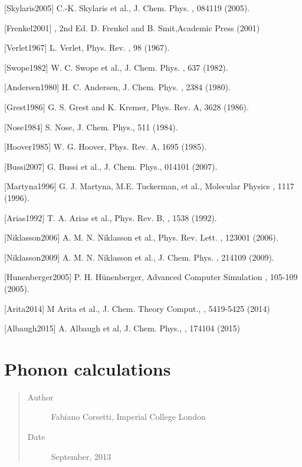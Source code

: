\documentclass[letterpaper,10pt,english]{sphinxmanual}
\begin{document}
{[}Skylaris2005{]} C.-K. Skylaris et al., J. Chem. Phys. , 084119 (2005).

{[}Frenkel2001{]} , 2nd Ed. D. Frenkel and B. Smit,Academic Press (2001)

{[}Verlet1967{]} L. Verlet, Phys. Rev. , 98 (1967).

{[}Swope1982{]} W. C. Swope et al., J. Chem. Phys. , 637 (1982).

{[}Andersen1980{]} H. C. Andersen, J. Chem. Phys. , 2384 (1980).

{[}Grest1986{]} G. S. Grest and K. Kremer, Phys. Rev. A,  3628 (1986).

{[}Nose1984{]} S. Nose, J. Chem. Phys.,  511 (1984).

{[}Hoover1985{]} W. G. Hoover, Phys. Rev. A,  1695 (1985).

{[}Bussi2007{]} G. Bussi et al., J. Chem. Phys.,  014101 (2007).

{[}Martyna1996{]} G. J. Martyna, M.E. Tuckerman, et al., Molecular Physics , 1117 (1996).

{[}Arias1992{]} T. A. Arias et al., Phys. Rev. B, , 1538 (1992).

{[}Niklasson2006{]} A. M. N. Niklasson et al., Phys. Rev. Lett. , 123001 (2006).

{[}Niklasson2009{]} A. M. N. Niklasson et al., J. Chem. Phys. , 214109 (2009).

{[}Hunenberger2005{]} P. H. Hünenberger, Advanced Computer Simulation , 105-109 (2005).

{[}Arita2014{]} M Arita et al., J. Chem. Theory Comput., , 5419-5425 (2014)

{[}Albaugh2015{]} A. Albaugh et al, J. Chem. Phys., , 174104 (2015)


\section{Phonon calculations}
\label{\detokenize{phonons::doc}}\label{\detokenize{phonons:phonon-calculations}}\begin{quote}\begin{description}
\item[{Author}] \leavevmode
Fabiano Corsetti, Imperial College London

\item[{Date}] \leavevmode
September, 2013

\end{description}\end{quote}
\end{document}
